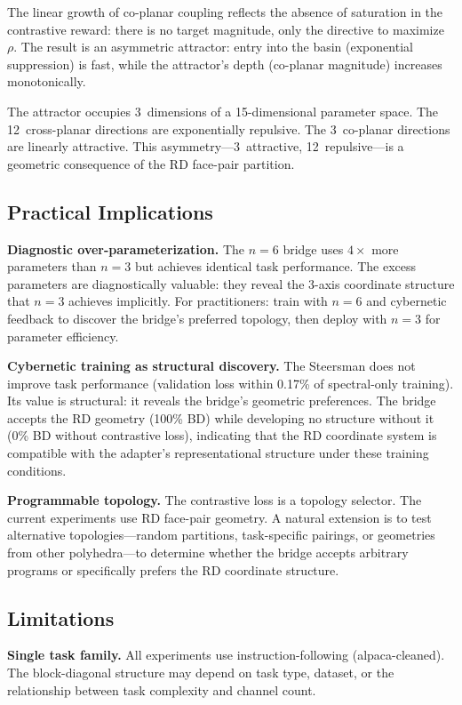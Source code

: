 \documentclass[11pt]{article}
\begin{document}
The linear growth of co-planar coupling reflects the absence of
saturation in the contrastive reward: there is no target magnitude,
only the directive to maximize~$\rho$. The result is an asymmetric
attractor: entry into the basin (exponential suppression) is fast,
while the attractor's depth (co-planar magnitude) increases
monotonically.

The attractor occupies 3~dimensions of a 15-dimensional parameter
space. The 12~cross-planar directions are exponentially repulsive.
The 3~co-planar directions are linearly attractive. This
asymmetry---3~attractive, 12~repulsive---is a geometric consequence
of the RD face-pair partition.

\subsection{Practical Implications}

\textbf{Diagnostic over-parameterization.} The $n = 6$ bridge uses
$4\times$ more parameters than $n = 3$ but achieves identical task
performance. The excess parameters are diagnostically valuable: they
reveal the 3-axis coordinate structure that $n = 3$ achieves
implicitly. For practitioners: train with $n = 6$ and cybernetic
feedback to discover the bridge's preferred topology, then deploy with
$n = 3$ for parameter efficiency.

\textbf{Cybernetic training as structural discovery.} The Steersman
does not improve task performance (validation loss within 0.17\% of
spectral-only training). Its value is structural: it reveals the
bridge's geometric preferences. The bridge
accepts the RD geometry (100\% BD) while developing no structure
without it (0\% BD without contrastive loss), indicating that the RD
coordinate system is compatible with the adapter's representational
structure under these training conditions.

\textbf{Programmable topology.} The contrastive loss is a topology
selector. The current experiments use RD face-pair geometry. A natural
extension is to test alternative topologies---random partitions,
task-specific pairings, or geometries from other polyhedra---to
determine whether the bridge accepts arbitrary programs or
specifically prefers the RD coordinate structure.

\subsection{Limitations}

\textbf{Single task family.} All experiments use instruction-following
(alpaca-cleaned). The block-diagonal structure may depend on task
type, dataset, or the relationship between task complexity and channel
count.
\end{document}
